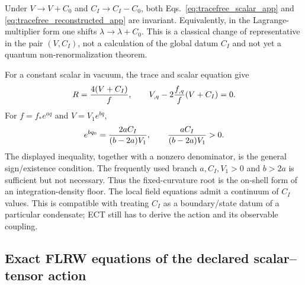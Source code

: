 Under $V\to V+C_0$ and $C_I\to C_I-C_0$, both
Eqs.~\eqref{eq:tracefree_scalar_app} and
\eqref{eq:tracefree_reconstructed_app} are invariant.  Equivalently, in
the Lagrange-multiplier form one shifts $\lambda\to\lambda+C_0$.  This is a
classical change of representative in the pair $(V,C_I)$, not a calculation
of the global datum $C_I$ and not yet a quantum non-renormalization theorem.

For a constant scalar in vacuum, the trace and scalar equation give
\begin{equation}
 R={4(V+C_I)\over f},\qquad
 V_{,q}-2{f_{,q}\over f}(V+C_I)=0.
 \label{eq:tracefree_vacuum_balance_app}
\end{equation}
For $f=f_*e^{aq}$ and $V=V_1e^{bq}$,
\begin{equation}
 e^{bq_0}={2aC_I\over(b-2a)V_1},
 \qquad {aC_I\over(b-2a)V_1}>0.
 \label{eq:tracefree_exponential_root_app}
\end{equation}
The displayed inequality, together with a nonzero denominator, is the
general sign/existence condition.  The frequently used branch
$a,C_I,V_1>0$ and $b>2a$ is sufficient but not necessary.
Thus the fixed-curvature root is the on-shell form of an integration-density
floor.  The local field equations admit a continuum of $C_I$ values.  This
is compatible with treating $C_I$ as a boundary/state datum of a particular
condensate; ECT still has to derive the action and its observable coupling.

\subsection{Exact FLRW equations of the declared scalar--tensor action}
\label{app:frw_cc}


